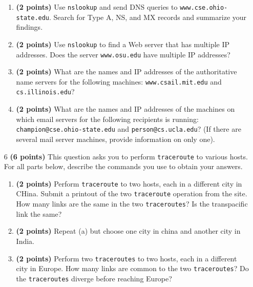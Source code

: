 \documentclass{article}
\begin{document}
\begin{enumerate}
  \begin{enumerate}
  \item \textbf{(2 points)} Use \texttt{nslookup} and send DNS queries to \texttt{www.cse.ohio-state.edu}. Search for Type A, NS, and MX records and summarize your findings.
  \item \textbf{(2 points)} Use \texttt{nslookup} to find a Web server that has multiple IP addresses. Does the server \texttt{www.osu.edu} have multiple IP addresses?
  \item \textbf{(2 points)} What are the names and IP addresses of the authoritative name servers for the following machines: \texttt{www.csail.mit.edu} and \texttt{cs.illinois.edu}?
  \item \textbf{(2 points)} What are the names and IP addresses of the machines on which email servers for the following recipients is running: \texttt{champion@cse.ohio-state.edu} and \texttt{person@cs.ucla.edu}? (If there are several mail server machines, provide information on only one).
  \end{enumerate}

\item[6]\textbf{(6 points)} This question asks you to perform \texttt{traceroute} to various hosts. For all parts below, describe the commands you use to obtain your answers.

  \begin{enumerate}
  \item \textbf{(2 points)} Perform \texttt{traceroute} to two hosts, each in a different city in CHina. Submit a printout of the two \texttt{traceroute} operation from the site. How many links are the same in the two \texttt{traceroutes}? Is the transpacific link the same?
  \item \textbf{(2 points)} Repeat (a) but choose one city in china and another city in India.
  \item \textbf{(2 points)} Perform two \texttt{traceroutes} to two hosts, each in a different city in Europe. How many links are common to the two \texttt{traceroutes}? Do the \texttt{traceroutes} diverge before reaching Europe?
  \end{enumerate}
\end{enumerate}
\end{document}
